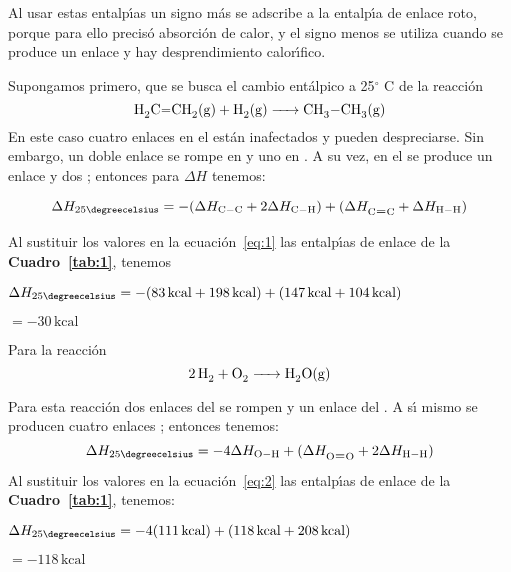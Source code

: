 Al usar estas entalp\'{\i}as un signo m\'as se adscribe a la entalp\'{\i}a de enlace roto, porque para ello precis\'o absorci\'on de calor, y el signo menos se utiliza cuando se produce un enlace y hay desprendimiento calor\'{\i}fico.
\pagebreak 
\begin{example}
Supongamos primero, que se busca el cambio ent\'alpico a 25$^\circ$
C de la reacci\'on
\begin{equation}
\ce{H2C=CH2 (g) + H2 (g) -> CH3-CH3 (g)}
\end{equation}
En este caso cuatro enlaces  en el  est\'an inafectados y pueden despreciarse. Sin embargo, un doble enlace se rompe en   y uno en . A su vez, en el  se produce un enlace   y dos ; entonces para $\Delta H$ tenemos:

\begin{equation}
\label{eq:1}
\Delta H_{25\degreecelsius} = - (\Delta H_{\ce{C-C}} + 2 \Delta H_{\ce{C-H}}) + (\Delta H_{\ce{C=C}} + \Delta H_{\ce{H-H}})
\end{equation}

Al sustituir los valores en la ecuaci\'on~\ref{eq:1} las entalp\'{\i}as de enlace de la \textbf{Cuadro~\ref{tab:1}}, tenemos

\hskip 1in   $\Delta H_{25\degreecelsius} = -(83 \,\textrm{kcal} + 198 \,\textrm{kcal}) + (147 \,\textrm{kcal} + 104 \,\textrm{kcal})$

\hskip 1.59in $= -30 \,\textrm{kcal}$
\end{example}
\begin{example}
 Para la reacci\'on
\begin{equation}
\ce{2H2   +  O2 ->  H2O(g)}
\end{equation}

Para esta reacci\'on dos enlaces  del  se rompen y un enlace  del . A s\'{\i} mismo se producen cuatro enlaces ; entonces tenemos:
\begin{equation}
\label{eq:2}
\Delta H_{25\degreecelsius} = - 4\Delta H_{\ce{O-H}} 
+ (\Delta H_{\ce{O=O}} + 2\Delta H_{\ce{H-H}})
\end{equation}
Al sustituir los valores en la ecuaci\'on~\ref{eq:2} las
entalp\'{\i}as de enlace de la \textbf{Cuadro~\ref{tab:1}}, tenemos:

\hskip 1in   $\Delta H_{25\degreecelsius} = -4(111 \,\textrm{kcal}) + (118 \,\textrm{kcal} + 208 \,\textrm{kcal})$

\hskip 1.59in $= -118  \,\textrm{kcal}$
\end{example}
